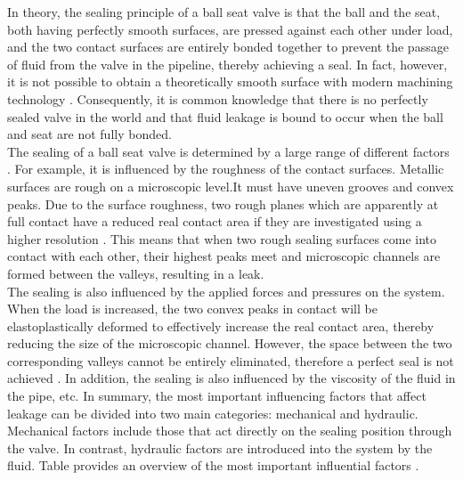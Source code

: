 In theory, the sealing principle of a ball seat valve is that the ball and the seat, both having 
perfectly smooth surfaces, are pressed against each other under load, and the two contact surfaces are 
entirely bonded together to prevent the passage of fluid from the valve in the pipeline, thereby achieving
a seal. In fact, however, it is not possible to obtain a theoretically smooth surface with 
modern machining technology \cite{Sealing1}. Consequently, it is common knowledge that there is no perfectly sealed valve in the world 
and that fluid leakage is bound to occur when the ball and seat are not fully bonded.\\

The sealing of a ball seat valve is determined by a large range of different factors \cite{fischer2021influence}.
For example, it is influenced by the roughness of the contact surfaces. Metallic surfaces are rough 
on a microscopic level.It must have uneven grooves and convex peaks. Due to the surface roughness, two rough 
planes which are apparently at full contact have a reduced real contact area if they 
are investigated using a higher resolution \cite{fischer2021geometry}. This means that when two 
rough sealing surfaces come into contact with each other,
 their highest peaks meet and microscopic channels are formed between the valleys, resulting in a leak.\\

 The sealing is also influenced by the applied forces and pressures on the system. When the load is increased,
  the two convex peaks in contact will be elastoplastically deformed to effectively increase the real contact area, 
  thereby reducing the size of the microscopic channel. However, the space between 
 the two corresponding valleys cannot be entirely eliminated, therefore a perfect seal is not achieved \cite{Sealing2}.
 In addition, the sealing is also influenced by the viscosity of the fluid in the pipe, etc. 
 In summary, the most important influencing factors that affect leakage can be divided into two main 
 categories: mechanical and hydraulic. Mechanical factors include those that act directly on the sealing 
 position through the valve. In contrast, hydraulic factors are introduced into 
 the system by the fluid. Table  provides an overview of the most 
 important influential factors \cite{PhD-M.S}.



